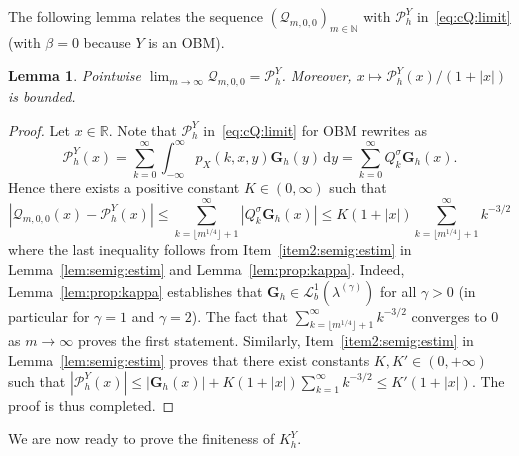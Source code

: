 \documentclass[12pt]{article}
\numberwithin{equation}{section}
\newtheorem{lemma}{Lemma}
\theoremstyle{definition}
\theoremstyle{remark}
\newcommand{\NN}{\mathbb{N}}
\newcommand{\cQ}{\mathcal{Q}}
\newcommand{\vd}{\,\mathrm{d}}
\newcommand{\Lgb}[1]{\mathcal{L}^{1}_{b}(\lambda^{(#1)})}
\newcommand{\bfG}[1]{\mathbf{G}_{#1}}
\begin{document}
%
%
The following lemma relates the sequence $(\cQ_{m,0,0})_{m\in \NN}$ with $\mathcal{P}_{h}^{Y} $ in~\eqref{eq:cQ:limit} (with $\beta=0$ because $Y$ is an OBM).
%
%
\begin{lemma} \label{lem:cQ:conv}
Pointwise	
$\lim_{m\to\infty} \cQ_{m,0,0} = \mathcal{P}_{h}^{Y} $. 
Moreover, $x\mapsto \mathcal{P}_{h}^{Y}(x)/(1+|x|) $ is bounded.
\end{lemma}
%
%
\begin{proof}
 Let $x\in \mathbb{R}$.
	Note that $\mathcal{P}_{h}^{Y}$ in~\eqref{eq:cQ:limit} for OBM rewrites as
	\[
		\mathcal{P}_{h}^{Y}(x)=\sum_{k=0}^{\infty } \int_{-\infty}^{\infty} p_X(k, x, y) \bfG{h}(y) \vd y
		= \sum_{k=0}^{\infty } Q^\sigma_k \bfG{h}(x) .
	\]
Hence there exists a positive constant $K\in (0,\infty)$ such that
\[ 
	\left| \cQ_{m,0,0}(x) - \mathcal{P}_{h}^{Y}(x) \right| 
	\leq 
	\sum_{k=\lfloor m^{1/4}\rfloor+1}^{\infty} \left|  Q^\sigma_k \bfG{h}(x) \right| \leq K (1+|x|) \sum_{k=\lfloor m^{1/4}\rfloor+1}^{\infty} k^{-3/2}
\]
where the last inequality follows from 
Item~\ref{item2:semig:estim} in Lemma~\ref{lem:semig:estim} 
and Lemma~\ref{lem:prop:kappa}. Indeed, Lemma~\ref{lem:prop:kappa} establishes that $\bfG{h}\in \Lgb{\gamma}$ for all $\gamma>0$ (in particular for $\gamma =1$ and $\gamma =2$).
The fact that $\sum_{k=\lfloor m^{1/4}\rfloor+1}^{\infty} k^{-3/2}$ converges to $0$ as $m\to\infty$ proves the first statement.
Similarly, Item~\ref{item2:semig:estim} in Lemma~\ref{lem:semig:estim} 
proves that there exist constants $K,K'\in (0,+\infty)$ such that
$
	|\mathcal{P}_{h}^{Y}(x)| 
	\leq  |\bfG{h}(x)| + K (1+|x|) \sum_{k=1}^{\infty} k^{-3/2} 
	\leq K' (1+|x|).
$
The proof is thus completed.
\end{proof}


We are now ready to prove the finiteness of $K_h^Y$. 
\end{document}
